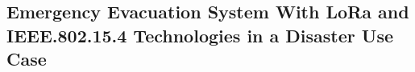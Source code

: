 \begin{refsection}
\chapter[21]{Emergency Evacuation System With LoRa and IEEE.802.15.4 Technologies in a Disaster Use Case}

\biblio
\end{refsection}



